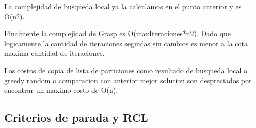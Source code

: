 La complejidad de busqueda local ya la calculamos en el punto anterior y es O(n2).

Finalmente la complejidad de Grasp es O(maxIteraciones*n2). Dado que logicamente la cantidad de iteraciones seguidas sin cambios es menor a la cota maxima cantidad de iteraciones.

Los costos de copia de lista de particiones como resultado de busqueda local o greedy random o comparacion con anterior mejor solucion son despreciados por encontrar un maximo costo de O(n).


\subsection{Criterios de parada y RCL}


